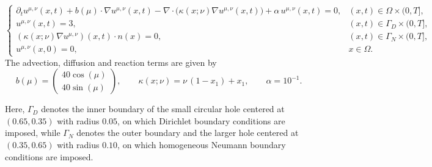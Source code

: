 \begin{equation*}
    \begin{cases}
    \displaystyle
    \partial_t u^{\mu,\nu}(x,t)
    + b(\mu)\cdot\nabla u^{\mu,\nu}(x,t)
    - \nabla\!\cdot\!\bigl(\kappa(x;\nu)\nabla u^{\mu,\nu}(x,t)\bigr)
    + \alpha\,u^{\mu,\nu}(x,t)
    = 0, 
    & (x,t)\in \Omega\times(0,T], \\[0.8em]
    \displaystyle
    u^{\mu,\nu}(x,t) = 3, 
    & (x,t)\in \Gamma_D\times(0,T], \\[0.8em]
    \displaystyle
    (\kappa(x;\nu)\nabla u^{\mu,\nu})(x,t)\cdot n(x) = 0, 
    & (x,t)\in \Gamma_N\times(0,T], \\[0.8em]
    \displaystyle
    u^{\mu,\nu}(x,0) = 0, 
    & x\in \Omega.
    \end{cases}
\end{equation*}
The advection, diffusion and reaction terms are given by
\begin{equation*}
    b(\mu) = 
    \begin{pmatrix}
    40\cos(\mu) \\[0.3em]
    40\sin(\mu)
    \end{pmatrix},
    \qquad
    \kappa(x;\nu) = \nu\,(1-x_1) + x_1,
    \qquad
    \alpha = 10^{-1}.
\end{equation*}

Here, $\Gamma_D$ denotes the inner boundary of the small circular hole centered at $(0.65,0.35)$
with radius $0.05$, on which Dirichlet boundary conditions are imposed,
while $\Gamma_N$ denotes the outer boundary and the larger hole centered at $(0.35,0.65)$
with radius $0.10$, on which homogeneous Neumann boundary conditions are imposed.




